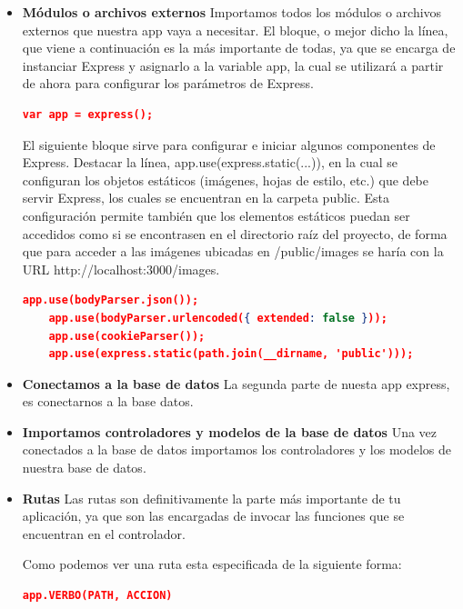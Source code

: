 \begin{itemize}

    \item \textbf{Módulos o archivos externos} Importamos todos los módulos o archivos externos que nuestra app vaya a necesitar. El bloque, o mejor dicho la línea, que viene a continuación es la más importante de todas, ya que se encarga de instanciar Express y asignarlo a la variable app, la cual se utilizará a partir de ahora para configurar los parámetros de Express.
    
    \begin{lstlisting}[language=JSON] 
    var app = express();
   \end{lstlisting}
   
   El siguiente bloque sirve para configurar e iniciar algunos componentes de Express. Destacar la línea, app.use(express.static(...)), en la cual se configuran los objetos estáticos (imágenes, hojas de estilo, etc.) que debe servir Express, los cuales se encuentran en la carpeta public. Esta configuración permite también que los elementos estáticos puedan ser accedidos como si se encontrasen en el directorio raíz del proyecto, de forma que para acceder a las imágenes ubicadas en /public/images se haría con la URL http://localhost:3000/images.
    \begin{lstlisting}[language=JSON] 
    app.use(bodyParser.json());
    app.use(bodyParser.urlencoded({ extended: false }));
    app.use(cookieParser());
    app.use(express.static(path.join(__dirname, 'public')));
   \end{lstlisting}
   
    
    \item \textbf{Conectamos a la base de datos} La segunda parte de nuesta app express, es conectarnos a la base datos. 
    
    \item \textbf{Importamos controladores y modelos de la base de datos} Una vez conectados a la base de datos importamos los controladores y los modelos de nuestra base de datos.
    
    
   \item \textbf{Rutas} Las rutas son definitivamente la parte más importante de tu aplicación, ya que son las encargadas de invocar las funciones que se encuentran en el controlador.
   
   Como podemos ver una ruta esta especificada de la siguiente forma:
   \begin{lstlisting}[language=JSON] 
    app.VERBO(PATH, ACCION)
   \end{lstlisting}
   

\end{itemize}
